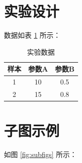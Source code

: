 \documentclass[12pt, a4paper, openany]{ctexbook} %
\begin{document}
\section{实验设计}
数据如表 \ref{tab:data} 所示：
\begin{table}[htbp]
    \centering
    \caption{实验数据}
    \begin{tabular}{|c|c|c|}
        \hline
        样本 & 参数A & 参数B \\ \hline
        1    & 10    & 0.5   \\ \hline
        2    & 15    & 0.8   \\ \hline
    \end{tabular}
    \label{tab:data}
\end{table}

\section{子图示例}
如图 \ref{fig:subfigs} 所示：
\end{document}
